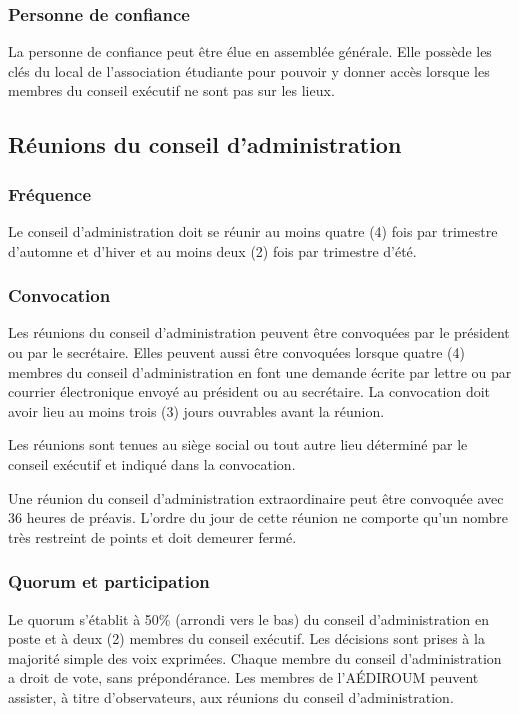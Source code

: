 \documentclass{aediroum}
\begin{document}
\subsubsection{Personne de confiance}\label{sec:personne-de-confiance}
La personne de confiance peut être élue en assemblée générale. Elle possède les clés du local de l'association étudiante pour pouvoir y donner accès lorsque les membres du conseil exécutif ne sont pas sur les lieux.

\subsection{Réunions du conseil d'administration}\label{sec:reunions-du-conseil-dadministration}
\subsubsection{Fréquence}\label{sec:frequence}

Le conseil d'administration doit se réunir au moins quatre (4) fois par trimestre d'automne et d'hiver et au moins deux (2) fois par trimestre d'été.

\subsubsection{Convocation}\label{sec:convocation-administration}

Les réunions du conseil d'administration peuvent être convoquées par le président ou par le secrétaire. Elles peuvent aussi être convoquées lorsque quatre (4) membres du conseil d'administration en font une demande écrite par lettre ou par courrier électronique envoyé au président ou au secrétaire. La convocation doit avoir lieu au moins trois (3) jours ouvrables avant la réunion.

Les réunions sont tenues au siège social ou tout autre lieu déterminé par le conseil exécutif et indiqué dans la convocation.

Une réunion du conseil d'administration extraordinaire peut être convoquée avec 36 heures de préavis. L'ordre du jour de cette réunion ne comporte qu'un nombre très restreint de points et doit demeurer fermé.

\subsubsection{Quorum et participation}\label{sec:quorum-et-participation}

Le quorum s'établit à 50\% (arrondi vers le bas) du conseil d'administration en poste et à deux (2) membres du conseil exécutif. Les décisions sont prises à la majorité simple des voix exprimées. Chaque membre du conseil d'administration a droit de vote, sans prépondérance. Les membres de l'AÉDIROUM peuvent assister, à titre d'observateurs, aux réunions du conseil d'administration.
\end{document}
